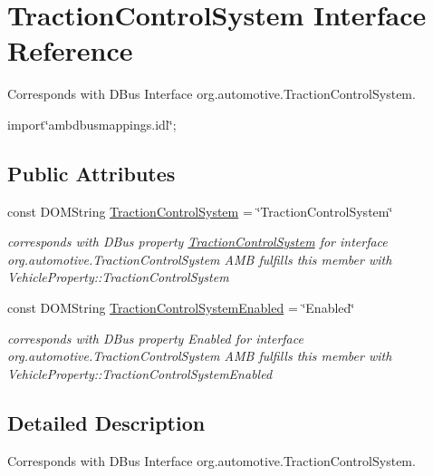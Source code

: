 \hypertarget{interfaceTractionControlSystem}{\section{Traction\+Control\+System Interface Reference}
\label{interfaceTractionControlSystem}
}


Corresponds with D\+Bus Interface org.\+automotive.\+Traction\+Control\+System.  




{\ttfamily import\char`\"{}ambdbusmappings.\+idl\char`\"{};}

\subsection*{Public Attributes}
\begin{DoxyCompactItemize}
\item 
const D\+O\+M\+String \hyperlink{interfaceTractionControlSystem_afa6b052fdb3c23cb965a73e93bd34400}{Traction\+Control\+System} = \char`\"{}Traction\+Control\+System\char`\"{}
\begin{DoxyCompactList}\small\item\em corresponds with D\+Bus property \hyperlink{interfaceTractionControlSystem}{Traction\+Control\+System} for interface org.\+automotive.\+Traction\+Control\+System A\+M\+B fulfills this member with Vehicle\+Property\+::\+Traction\+Control\+System \end{DoxyCompactList}\item 
\hypertarget{interfaceTractionControlSystem_a7392cc43962b76f1b46aafc3fed5ed26}{const D\+O\+M\+String \hyperlink{interfaceTractionControlSystem_a7392cc43962b76f1b46aafc3fed5ed26}{Traction\+Control\+System\+Enabled} = \char`\"{}Enabled\char`\"{}}\label{interfaceTractionControlSystem_a7392cc43962b76f1b46aafc3fed5ed26}

\begin{DoxyCompactList}\small\item\em corresponds with D\+Bus property Enabled for interface org.\+automotive.\+Traction\+Control\+System A\+M\+B fulfills this member with Vehicle\+Property\+::\+Traction\+Control\+System\+Enabled \end{DoxyCompactList}\end{DoxyCompactItemize}


\subsection{Detailed Description}
Corresponds with D\+Bus Interface org.\+automotive.\+Traction\+Control\+System. 

